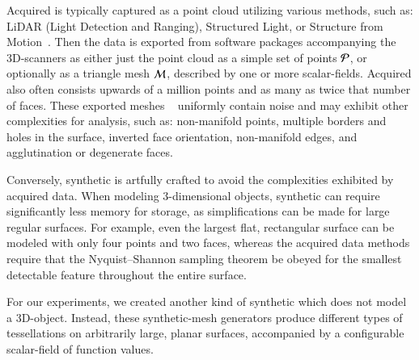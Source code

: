 Acquired \tdd{} is typically captured as a point cloud utilizing various methods, such as: LiDAR (Light Detection and Ranging), Structured Light, or Structure from Motion~\cite[p.~19]{Mara12}. Then the data is exported from software packages accompanying the 3D-scanners as either just the point cloud as a simple set of points $\mathcal{P}$, or optionally as a triangle mesh $\mathcal{M}$, described by one or more scalar-fields. Acquired \tdd{} also often consists upwards of a million points and as many as twice that number of faces. These exported meshes ~\cite[p.~25]{Mara12} uniformly contain noise and may exhibit other complexities for analysis, such as: non-manifold points, multiple borders and holes in the surface, inverted face orientation, non-manifold edges, and agglutination or degenerate faces. ~\cite[p.~28-32]{Mara12}

Conversely, synthetic \tdd{} is artfully crafted to avoid the complexities exhibited by acquired data. When modeling 3-dimensional objects, synthetic \tdd{} can require significantly less memory for storage, as simplifications can be made for large regular surfaces. For example, even the largest flat, rectangular surface can be modeled with only four points and two faces, whereas the acquired data methods require that the Nyquist–Shannon sampling theorem be obeyed for the smallest detectable feature throughout the entire surface.~\cite[p.~19]{Mara12}~\cite[p.~3]{Mara17}

For our experiments, we created another kind of synthetic \tdd{} which does not model a 3D-object. Instead, these synthetic-mesh generators produce different types of tessellations on arbitrarily large, planar surfaces, accompanied by a configurable scalar-field of function values.

%
%
%
